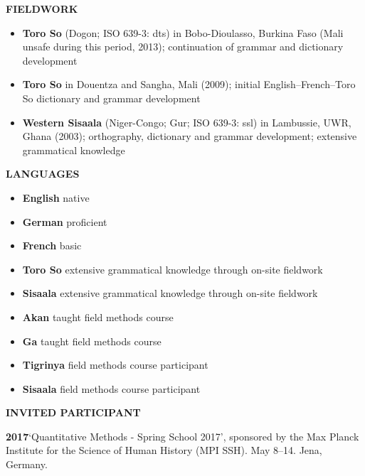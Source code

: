 \documentclass[11pt]{article}
\newcommand{\hangpara}{
 \setlength{\parindent}{0in} %
 \hangindent=0.42in %
}
\begin{document}
\vskip 10pt
\begin{flushleft}
{\bf FIELDWORK}
\end{flushleft}
\begin{itemize}
\item {\bf Toro So} (Dogon; ISO 639-3: dts) in Bobo-Dioulasso, Burkina Faso (Mali unsafe during this period, 2013); continuation of grammar and dictionary development
\item {\bf Toro So} in Douentza and Sangha, Mali (2009); initial English--French--Toro So dictionary and grammar development
\item {\bf Western Sisaala} (Niger-Congo; Gur; ISO 639-3: ssl) in Lambussie, UWR, Ghana (2003); orthography, dictionary and grammar development; extensive grammatical knowledge
\end{itemize}

\vskip 10pt
\begin{flushleft}
{\bf LANGUAGES}
\end{flushleft}
\begin{itemize}
\item {\bf English} native
\item {\bf German} proficient
\item {\bf French} basic
\item {\bf Toro So} extensive grammatical knowledge through on-site fieldwork
\item {\bf Sisaala} extensive grammatical knowledge through on-site fieldwork
\item {\bf Akan} taught field methods course
\item {\bf Ga} taught field methods course
\item {\bf Tigrinya} field methods course participant
\item {\bf Sisaala} field methods course participant
\end{itemize}


\clearpage
\vskip 10pt
\begin{flushleft}
{\bf INVITED PARTICIPANT}
\end{flushleft}

\hangpara
{\bf 2017}\hspace{1ex}`Quantitative Methods - Spring School 2017', sponsored by the Max Planck Institute for the Science of Human History (MPI SSH). May 8--14. Jena, Germany.
\end{document}
